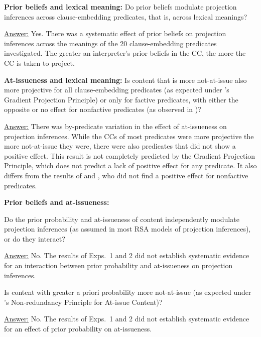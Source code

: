 \documentclass[11pt,fleqn]{article}
\newcommand{\6}{\mbox{$[\hspace*{-.6mm}[$}}
\newcommand{\9}{\mbox{$]\hspace*{-.6mm}]$}}
\newcommand{\citepos}[1]{\citeauthor{#1}'s \citeyear{#1}}
\begin{document}
\begin{exe}

 {\bf Prior beliefs and lexical meaning:} Do prior beliefs modulate projection inferences across clause-embedding predicates, that is, across lexical meanings?

\underline{Answer:} Yes. There was a systematic effect of prior beliefs on projection inferences across the meanings of the 20 clause-embedding predicates investigated. The greater an interpreter's prior beliefs in the CC, the more the CC is taken to project.

 {\bf At-issueness and lexical meaning:} Is content that is more not-at-issue also more projective for all clause-embedding predicates (as expected under \citepos{tbd-variability} Gradient Projection Principle) or only for factive predicates, with either the opposite or no effect for nonfactive predicates (as observed in \citealt{djaerv-bacovcin-salt27,djaerv-bacovcin2020,mahler-etal2020})? 

\underline{Answer:} There was by-predicate variation in the effect of at-issueness on projection inferences. While the CCs of most predicates were more projective the more not-at-issue they were, there were also predicates that did not show a positive effect. This result is  not completely predicted by the Gradient Projection Principle, which does not predict a lack of positive effect for any predicate. It also differs from the results of \cite{djaerv-bacovcin2020} and \cite{mahler-etal2020}, who did not find a positive effect for nonfactive predicates.

 {\bf Prior beliefs and at-issueness:} 
\begin{xlist}
  Do the prior probability and at-issueness of content independently modulate projection inferences  (as assumed in most RSA models of projection inferences), or do they interact?  

\underline{Answer:} No. The results of Exps.~1 and 2 did not establish systematic evidence for an interaction between prior probability and at-issueness on projection inferences.

 Is content with greater a priori probability more not-at-issue (as expected under \citepos{tonhauser-etal-eval} Non-redundancy Principle for At-issue Content)?

\underline{Answer:} No. The results of Exps.~1 and 2 did not establish systematic evidence for an effect of prior probability on at-issueness. 

\end{xlist}
\end{exe}
\end{document}
